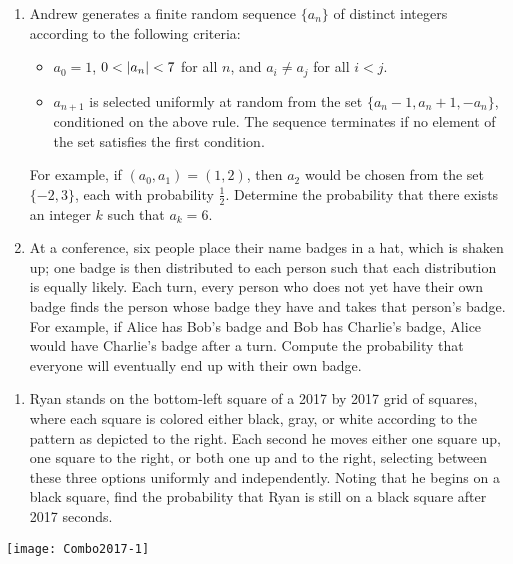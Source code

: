 \documentclass[10pt]{article}
\newcounter{enum}
\DeclarePairedDelimiter\abs{\lvert}{\rvert}
\begin{document}
\begin{enumerate}
\item Andrew generates a finite random sequence $\{a_n\}$ of distinct integers according to the following criteria:
\begin{itemize}
\item $a_0 = 1$, $0 < \abs{a_n} < 7$ for all $n$, and $a_i \neq a_j$ for all $i < j$.
\item $a_{n+1}$ is selected uniformly at random from the set $\{a_n - 1, a_n + 1, -a_n\}$, conditioned on the above rule. The sequence terminates if no element of the set satisfies the first condition.
\end{itemize}
For example, if $(a_0, a_1) = (1, 2)$, then $a_2$ would be chosen from the set $\{-2,3\}$, each with probability $\tfrac12$. Determine the probability that there exists an integer $k$ such that $a_k = 6$.

\item At a conference, six people place their name badges in a hat, which is shaken up; one badge is then distributed to each person such that each distribution is equally likely. Each turn, every person who does not yet have their own badge finds the person whose badge they have and takes that person's badge. For example, if Alice has Bob's badge and Bob has Charlie's badge, Alice would have Charlie's badge after a turn. Compute the probability that everyone will eventually end up with their own badge.

\setcounter{enum}{\theenumi}
\end{enumerate}

\hspace*{-\parindent}%
\begin{minipage}{0.80\textwidth}
\begin{enumerate}
\setcounter{enumi}{\theenum}
\item Ryan stands on the bottom-left square of a 2017 by 2017 grid of squares, where each square is colored either black, gray, or white according to the pattern as depicted to the right. Each second he moves either one square up, one square to the right, or both one up and to the right, selecting between these three options uniformly and independently. Noting that he begins on a black square, find the probability that Ryan is still on a black square after 2017 seconds.
\setcounter{enum}{\theenumi}
\end{enumerate}

\end{minipage} \hfill
\begin{minipage}{0.15\textwidth}
\centering
\vspace{-7pt}
\texttt{[image: Combo2017-1]}
\end{minipage}
\end{document}
